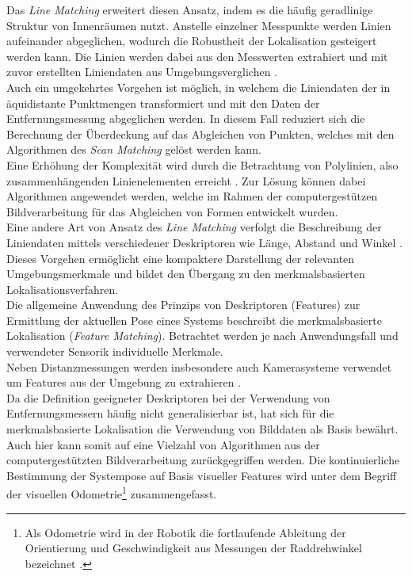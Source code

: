 Das \textit{Line Matching} erweitert diesen Ansatz, indem es die häufig geradlinige Struktur von Innenräumen nutzt. Anstelle einzelner Messpunkte werden Linien aufeinander abgeglichen, wodurch die Robustheit der Lokalisation gesteigert werden kann. Die Linien werden dabei aus den Messwerten extrahiert und mit zuvor erstellten Liniendaten aus Umgebungs\red[karten] verglichen \cite{Cox1991}\cite{Gutmann1999}.\\
Auch ein umgekehrtes Vorgehen ist möglich, in welchem die Liniendaten der \red[Karten] in äquidistante Punktmengen transformiert und mit den Daten der Entfernungsmessung abgeglichen werden. In diesem Fall reduziert sich die Berechnung der Überdeckung auf das Abgleichen von Punkten, welches mit den Algorithmen des \textit{Scan Matching} gelöst werden kann.\\

Eine Erhöhung der Komplexität wird durch die Betrachtung von Polylinien, also zusammenhängenden Linienelementen erreicht \cite{Wolter2004}. Zur Lösung können dabei Algorithmen angewendet werden, welche im Rahmen der computergestützen Bildverarbeitung für das Abgleichen von Formen entwickelt wurden.\\
Eine andere Art von Ansatz des \textit{Line Matching} verfolgt die Beschreibung der Liniendaten mittels verschiedener Deskriptoren wie Länge, Abstand und Winkel \cite{Frey2014}\cite{Garulli2005}. Dieses Vorgehen ermöglicht eine kompaktere Darstellung der relevanten Umgebungsmerkmale und bildet den Übergang zu den merkmalsbasierten Lokalisationsverfahren.\\

Die allgemeine Anwendung des Prinzips von Deskriptoren (Features) zur Ermittlung der aktuellen Pose eines Systems beschreibt die merkmalsbasierte Lokalisation (\textit{Feature Matching}). Betrachtet werden je nach Anwendungsfall und verwendeter Sensorik individuelle Merkmale.\\
Neben Distanzmessungen \cite{Tomono2004} werden insbesondere auch Kamerasysteme verwendet um Features aus der Umgebung zu extrahieren \cite{Se2001}.\\
Da die Definition geeigneter Deskriptoren bei der Verwendung von Entfernungsmessern häufig nicht generalisierbar ist, hat sich für die merkmalsbasierte Lokalisation die Verwendung von Bilddaten als Basis bewährt. Auch hier kann somit auf eine Vielzahl von Algorithmen aus der computergestützten Bildverarbeitung zurückgegriffen werden. 
Die kontinuierliche Bestimmung der Systempose auf Basis visueller Features wird unter dem Begriff der visuellen Odometrie\footnote{Als Odometrie wird in der Robotik die fortlaufende Ableitung der Orientierung und Geschwindigkeit aus Messungen der Raddrehwinkel bezeichnet \cite{Hertzberg2012}.} \cite{Mccarthy2003} zusammengefasst.\\

